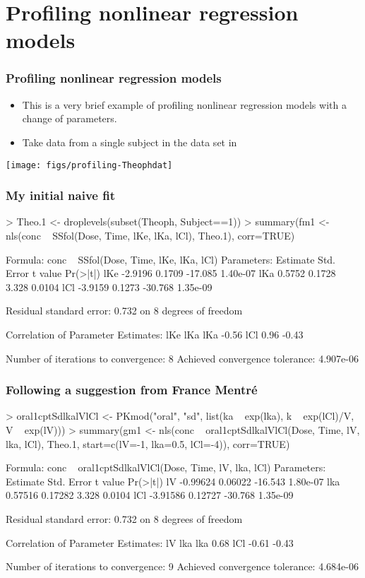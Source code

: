 \documentclass[dvipsnames,pdflatex,beamer]{beamer}
\begin{document}
\section{Profiling nonlinear regression models}
\label{sec:nonlinear}

\begin{frame}[fragile]
  \frametitle{Profiling nonlinear regression models}
  \begin{itemize}
  \item This is a very brief example of profiling nonlinear regression
    models with a change of parameters.
  \item Take data from a single subject in the  data set
    in 
  \end{itemize}
\texttt{[image: figs/profiling-Theophdat]}
\end{frame}
\begin{frame}[fragile]
  \frametitle{My initial naive fit}
\begin{Schunk}
\begin{Sinput}
> Theo.1 <- droplevels(subset(Theoph, Subject==1))
> summary(fm1 <- nls(conc ~ SSfol(Dose, Time, lKe, lKa, lCl), Theo.1), corr=TRUE)
\end{Sinput}
\begin{Soutput}
Formula: conc ~ SSfol(Dose, Time, lKe, lKa, lCl)
Parameters:
    Estimate Std. Error t value Pr(>|t|)
lKe  -2.9196     0.1709 -17.085 1.40e-07
lKa   0.5752     0.1728   3.328   0.0104
lCl  -3.9159     0.1273 -30.768 1.35e-09

Residual standard error: 0.732 on 8 degrees of freedom

Correlation of Parameter Estimates:
    lKe   lKa  
lKa -0.56      
lCl  0.96 -0.43

Number of iterations to convergence: 8 
Achieved convergence tolerance: 4.907e-06 
\end{Soutput}
\end{Schunk}
\end{frame}
\begin{frame}[fragile]
  \frametitle{Following a suggestion from France Mentr\'{e}}
\begin{Schunk}
\begin{Sinput}
> oral1cptSdlkalVlCl <- PKmod("oral", "sd", list(ka ~ exp(lka), k ~ exp(lCl)/V, V ~ exp(lV)))
> summary(gm1 <- nls(conc ~ oral1cptSdlkalVlCl(Dose, Time, lV, lka, lCl), Theo.1, start=c(lV=-1, lka=0.5, lCl=-4)), corr=TRUE)
\end{Sinput}
\begin{Soutput}
Formula: conc ~ oral1cptSdlkalVlCl(Dose, Time, lV, lka, lCl)
Parameters:
    Estimate Std. Error t value Pr(>|t|)
lV  -0.99624    0.06022 -16.543 1.80e-07
lka  0.57516    0.17282   3.328   0.0104
lCl -3.91586    0.12727 -30.768 1.35e-09

Residual standard error: 0.732 on 8 degrees of freedom

Correlation of Parameter Estimates:
    lV    lka  
lka  0.68      
lCl -0.61 -0.43

Number of iterations to convergence: 9 
Achieved convergence tolerance: 4.684e-06 
\end{Soutput}
\end{Schunk}
\end{frame}
\end{document}
